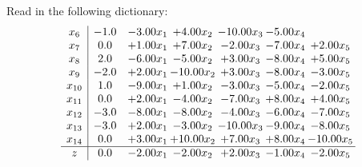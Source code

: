 \documentclass[9pt]{article}
\begin{document}
Read in the following dictionary:
\[\begin{array}{c| c c@{\hskip 2pt} c@{\hskip 2pt} c@{\hskip 2pt} c@{\hskip 2pt} c@{\hskip 2pt} }
 x_{6}   &  -1.0 & -3.00 x_{1} & +  4.00 x_{2} & -10.00 x_{3} & -5.00 x_{4} &   \\
 x_{7}   &  0.0 & +  1.00 x_{1} & +  7.00 x_{2} & -2.00 x_{3} & -7.00 x_{4} & +  2.00 x_{5}\\
 x_{8}   &  2.0 & -6.00 x_{1} & -5.00 x_{2} & +  3.00 x_{3} & -8.00 x_{4} & +  5.00 x_{5}\\
 x_{9}   &  -2.0 & +  2.00 x_{1} & -10.00 x_{2} & +  3.00 x_{3} & -8.00 x_{4} & -3.00 x_{5}\\
 x_{10}   &  1.0 & -9.00 x_{1} & +  1.00 x_{2} & -3.00 x_{3} & -5.00 x_{4} & -2.00 x_{5}\\
 x_{11}   &  0.0 & +  2.00 x_{1} & -4.00 x_{2} & -7.00 x_{3} & +  8.00 x_{4} & +  4.00 x_{5}\\
 x_{12}   &  -3.0 & -8.00 x_{1} & -8.00 x_{2} & -4.00 x_{3} & -6.00 x_{4} & -7.00 x_{5}\\
 x_{13}   &  -3.0 & +  2.00 x_{1} & -3.00 x_{2} & -10.00 x_{3} & -9.00 x_{4} & -8.00 x_{5}\\
 x_{14}   &  0.0 & +  3.00 x_{1} & + 10.00 x_{2} & +  7.00 x_{3} & +  8.00 x_{4} & -10.00 x_{5}\\
\hline
z    &  0.0 & -2.00 x_{1} & -2.00 x_{2} & +  2.00 x_{3} & -1.00 x_{4} & -2.00 x_{5}\\
\end{array}\]
\end{document}
